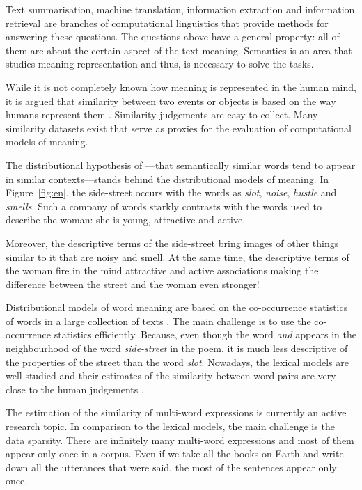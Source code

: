 Text summarisation, machine translation, information extraction and information retrieval are branches of computational linguistics that provide methods for answering these questions. The questions above have a general property: all of them are about the certain aspect of the text meaning. Semantics is an area that studies meaning representation and thus, is necessary to solve the tasks.

While it is not completely known how meaning is represented in the human mind, it is argued that similarity between two events or objects is based on the way humans represent them \cite{WCS:WCS1282}. Similarity judgements are easy to collect. Many similarity datasets exist that serve as proxies for the evaluation of computational models of meaning.

The distributional hypothesis of \citet{harris1954distributional}---that semantically similar words tend to appear in similar contexts---stands behind the distributional models of meaning. In Figure~\ref{fig:en}, the side-street occurs with the words as \textit{slot}, \textit{noise}, \textit{hustle} and \textit{smells}. Such a company of words starkly contrasts with the words used to describe the woman: she is young, attractive and active.

Moreover, the descriptive terms of the side-street bring images of other things similar to it that are noisy and smell. At the same time, the descriptive terms of the woman fire in the mind attractive and active associations making the difference between the street and the woman even stronger!

Distributional models of word meaning are based on the co-occurrence statistics of words in a large collection of texts \cite{Turney:2010:FMV:1861751.1861756,mikolov2013linguistic,mikolov2013distributed,mikolov2013efficient}. The main challenge is to use the co-occurrence statistics efficiently. Because, even though the word \textit{and} appears in the neighbourhood of the word \textit{side-street} in the poem, it is much less descriptive of the properties of the street than the word \textit{slot}. Nowadays, the lexical models are well studied and their estimates of the similarity between word pairs are very close to the human judgements \cite{TACL570,baroni-dinu-kruszewski:2014:P14-1,Halawi:2012:LLW:2339530.2339751}.

The estimation of the similarity of multi-word expressions is currently an active research topic. In comparison to the lexical models, the main challenge is the data sparsity. There are infinitely many multi-word expressions and most of them appear only once in a corpus. Even if we take all the books on Earth and write down all the utterances that were said, the most of the sentences appear only once.

